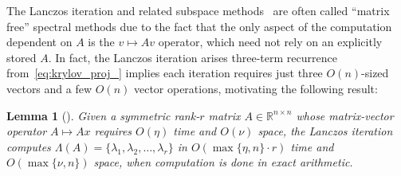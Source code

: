 \documentclass[10pt]{article}
\numberwithin{equation}{section}
\newcommand{\+}{%
	\raisebox{0.18ex}{\scaleobj{0.55}{+}}
}
\newtheorem{corollary}{Corollary}
\newtheorem{lemma}{Lemma}
\theoremstyle{definition}
\theoremstyle{definition}
\begin{document}
 The Lanczos iteration and related subspace methods~\cite{} are often called ``matrix free'' spectral methods due to the fact that the only aspect of the computation dependent on $A$ is the $v \mapsto Av$ operator, which need not rely on an explicitly stored $A$. 
In fact, the Lanczos iteration arises three-term recurrence from~\eqref{eq:krylov_proj_} implies each iteration requires just three $O(n)$-sized vectors and a few $O(n)$ vector operations, motivating the following result:
\begin{lemma}[\cite{parlett1994we, simon1984analysis}]\label{lemma:exact_arith_lanczos}
	Given a symmetric rank-$r$ matrix $A \in \mathbb{R}^{n \times n}$ whose matrix-vector operator $A \mapsto A x$ requires $O(\eta)$ time and $O(\nu)$ space, the Lanczos iteration computes $\Lambda(A) = \{ \lambda_1, \lambda_2, \dots, \lambda_r \}$ in $O(\max\{\eta, n\}\cdot r)$ time and $O(\max\{\nu, n\})$ space, when computation is done in exact arithmetic. 
\end{lemma}

\end{document}
